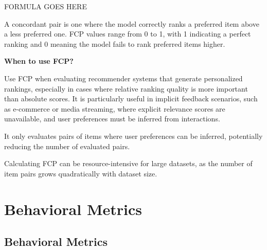 \begin{center}
    FORMULA GOES HERE
\end{center}

A concordant pair is one where the model correctly ranks a preferred item above a less preferred one. FCP values range from
0 to 1, with 1 indicating a perfect ranking and 0 meaning the model fails to rank preferred items higher.

\textbf{When to use FCP?}

Use FCP when evaluating recommender systems that generate personalized rankings, especially in cases where relative
ranking quality is more important than absolute scores. It is particularly useful in implicit feedback scenarios,
such as e-commerce or media streaming, where explicit relevance scores are unavailable, and user preferences must be
inferred from interactions.

{
    \item It only evaluates pairs of items where user preferences can be inferred, potentially reducing
    the number of evaluated pairs.
    \item Calculating FCP can be resource-intensive for large datasets, as the number of item pairs grows
    quadratically with dataset size.
}


\clearpage
\thispagestyle{rankingstyle}
\section{Behavioral Metrics}
\subsection{Behavioral Metrics}


